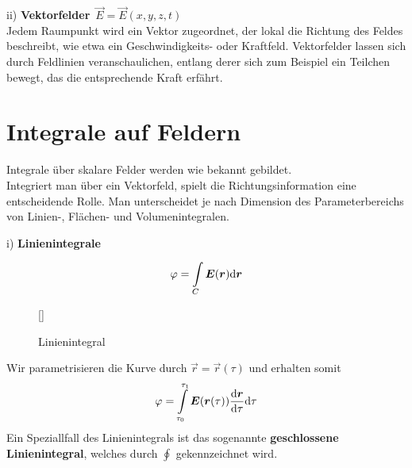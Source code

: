 ii)\textbf{ Vektorfelder}\ $\vec{E}=\vec{E}(x,y,z,t)$\\

Jedem Raumpunkt wird ein Vektor zugeordnet, der lokal die Richtung des Feldes beschreibt, wie etwa ein Geschwindigkeits- oder Kraftfeld. Vektorfelder lassen sich durch Feldlinien veranschaulichen, entlang derer sich zum Beispiel ein Teilchen bewegt, das die entsprechende Kraft erfährt.


\section{Integrale auf Feldern}
Integrale über skalare Felder werden wie bekannt gebildet.\\
Integriert man über ein Vektorfeld, spielt die Richtungsinformation eine entscheidende Rolle. Man unterscheidet je nach Dimension des Parameterbereichs von Linien-, Flächen- und Volumenintegralen.\\
\linebreak


i) \textbf{Linienintegrale}

\begin{equation*}
\varphi=\int\limits_{C}\bm{E}(\bm{r})\mathrm{d}\bm{r}
\end{equation*}

\begin{wrapfigure}[]{r}[0cm]{0cm}
	\raisebox{0pt}[\dimexpr{}\baselineskip\relax]{
		\colorbox{hgrey}{
		}
	}
	\caption{Linienintegral}
\end{wrapfigure}
Wir parametrisieren die Kurve durch $\vec{r}=\vec{r}(\tau)$ und erhalten somit
\begin{equation*}
\varphi=\int\limits_{\tau_0}^{\tau_1}\bm{E}(\bm{r}(\tau))\frac{\mathrm{d}{\bm{r}}}{\mathrm{d}{\tau}}\mathrm{d} \tau
\end{equation*}
Ein Speziallfall des Linienintegrals ist das sogenannte \textbf{geschlossene Linienintegral}, welches durch $\oint$ gekennzeichnet wird.\\
\linebreak


